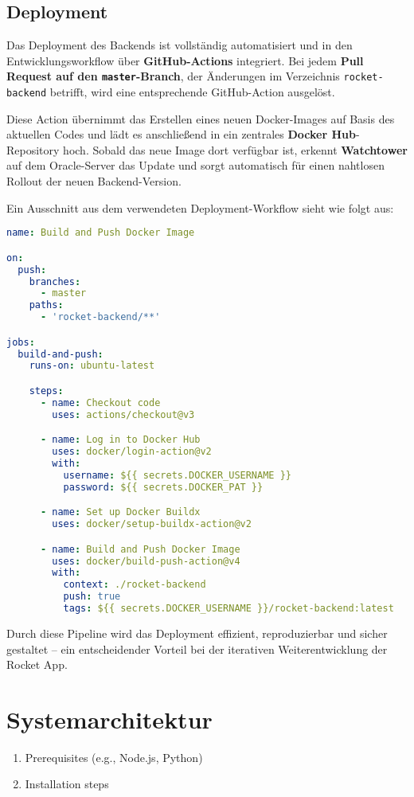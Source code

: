 \documentclass[11pt,a4paper]{article}
\begin{document}
\subsection{Deployment}

Das Deployment des Backends ist vollständig automatisiert und in den Entwicklungsworkflow über \textbf{GitHub-Actions} integriert. Bei jedem \textbf{Pull Request auf den \texttt{master}-Branch}, der Änderungen im Verzeichnis \texttt{rocket-backend} betrifft, wird eine entsprechende GitHub-Action ausgelöst.

Diese Action übernimmt das Erstellen eines neuen Docker-Images auf Basis des aktuellen Codes und lädt es anschließend in ein zentrales \textbf{Docker Hub}-Repository hoch. Sobald das neue Image dort verfügbar ist, erkennt \textbf{Watchtower} auf dem Oracle-Server das Update und sorgt automatisch für einen nahtlosen Rollout der neuen Backend-Version.

Ein Ausschnitt aus dem verwendeten Deployment-Workflow sieht wie folgt aus:

\begin{lstlisting}[language=yaml, caption={GitHub Action zur automatisierten Bereitstellung}, label={lst:deployment}]
name: Build and Push Docker Image

on:
  push:
    branches:
      - master
    paths:
      - 'rocket-backend/**'

jobs:
  build-and-push:
    runs-on: ubuntu-latest

    steps:
      - name: Checkout code
        uses: actions/checkout@v3

      - name: Log in to Docker Hub
        uses: docker/login-action@v2
        with:
          username: ${{ secrets.DOCKER_USERNAME }}
          password: ${{ secrets.DOCKER_PAT }}

      - name: Set up Docker Buildx
        uses: docker/setup-buildx-action@v2

      - name: Build and Push Docker Image
        uses: docker/build-push-action@v4
        with:
          context: ./rocket-backend
          push: true
          tags: ${{ secrets.DOCKER_USERNAME }}/rocket-backend:latest
\end{lstlisting}

Durch diese Pipeline wird das Deployment effizient, reproduzierbar und sicher gestaltet – ein entscheidender Vorteil bei der iterativen Weiterentwicklung der Rocket App.


\section{Systemarchitektur}
\begin{enumerate}
    \item Prerequisites (e.g., Node.js, Python)
    \item Installation steps
\end{enumerate}
\end{document}
